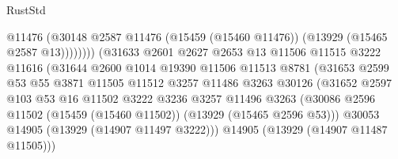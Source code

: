\begin{lexlean}{RustStd}
\begin{coremodule}
                                            @11476
                                            (@30148
                                              @2587
                                              @11476
                                              (@15459 (@15460 @11476))
                                              (@13929 (@15465 @2587 @13))))))))
                                  (@31633
                                    @2601
                                    @2627
                                    @2653
                                    @13
                                    @11506
                                    @11515
                                    @3222
                                    @11616
                                    (@31644
                                      @2600
                                      @1014
                                      @19390
                                      @11506
                                      @11513
                                      @8781
                                      (@31653
                                        @2599
                                        @53
                                        @55
                                        @3871
                                        @11505
                                        @11512
                                        @3257
                                        @11486
                                        @3263
                                        @30126
                                        (@31652
                                          @2597
                                          @103
                                          @53
                                          @16
                                          @11502
                                          @3222
                                          @3236
                                          @3257
                                          @11496
                                          @3263
                                          (@30086
                                            @2596
                                            @11502
                                            (@15459 (@15460 @11502))
                                            (@13929 (@15465 @2596 @53)))
                                          @30053
                                          @14905
                                          (@13929 (@14907 @11497 @3222)))
                                        @14905
                                        (@13929 (@14907 @11487 @11505)))

\end{coremodule}
\end{lexlean}
